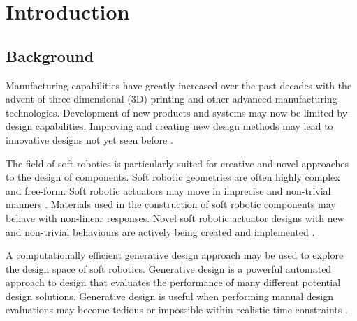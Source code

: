 \chapter{Introduction}
\label{chp:Intro}


\section{Background}

Manufacturing capabilities have greatly increased over the past decades with the advent of three dimensional (3D) printing and other advanced manufacturing technologies. Development of new products and systems may now be limited by design capabilities. Improving and creating new design methods may lead to innovative designs not yet seen before \cite{Shea2005}.

The field of soft robotics is particularly suited for creative and novel approaches to the design of components. Soft robotic geometries are often highly complex and free-form. Soft robotic actuators may move in imprecise and non-trivial manners \cite{Whitesides2018}. Materials used in the construction of soft robotic components may behave with non-linear responses\cite{Boyraz2018}. Novel soft robotic actuator designs with new and non-trivial behaviours are actively being created and implemented \cite{Ellis2020}.

A computationally efficient generative design approach may be used to explore the design space of soft robotics. Generative design is a powerful automated approach to design that evaluates the performance of many different potential design solutions. Generative design is useful when performing manual design evaluations may become tedious or impossible within realistic time constraints \citep{Brose1993}.